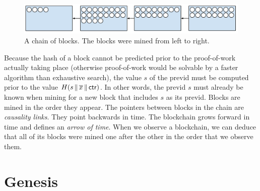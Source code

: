 \begin{figure}[h]
    \centering
    \includegraphics[width=1 \columnwidth,keepaspectratio]{figures/the-chain.pdf}
    \caption{A chain of blocks. The blocks were mined from left to right.}
    \label{fig.chain}
\end{figure}

Because the hash
of a block cannot be predicted prior to the proof-of-work actually taking place (otherwise
proof-of-work would be solvable by a faster algorithm than exhaustive search), the value
$s$ of the previd must be computed prior to the value $H(s \,\|\, \overline{x} \,\|\, \mathsf{ctr})$.
In other words, the previd $s$ must already be known when mining for a new block that includes
$s$ as its previd. Blocks are mined in the order they appear. The pointers between blocks
in the chain are \emph{causality links}. They point backwards in time. The blockchain grows
forward in time and defines an \emph{arrow of time}. When we observe a blockchain, we can
deduce that all of its blocks were mined one after the other in the order that we observe
them.


\section{Genesis}


